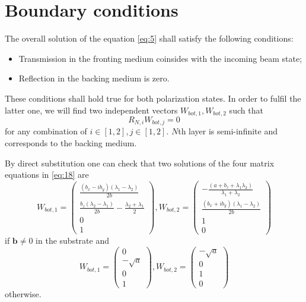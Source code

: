 \documentclass[12pt,a4paper]{article}
\begin{document}
\section{Boundary conditions}

The overall solution of the equation \ref{eq:5} shall satisfy the following conditions:

\begin{itemize}
\item Transmission in the fronting medium coinsides with the incoming beam state;
\item Reflection in the backing medium is zero.
\end{itemize}

These conditions shall hold true for both polarization states. In order to fulfil the latter one, we will find two independent vectors $W_{bot, 1}, W_{bot, 2}$ such that
\begin{equation} \label{eq:18}
R_{N, i} W_{bot, j} = 0
\end{equation}
for any combination of $i \in [1, 2], j \in [1, 2]$. $N$th layer is semi-infinite and corresponds to the backing medium.

By direct substitution one can check that two solutions of the four matrix equations in \ref{eq:18} are
\begin{equation} \label{eq:19}
W_{bot, 1}
=
\left(
\begin{matrix}
\frac{(b_x - i b_y) (\lambda_1 - \lambda_2)}{2 b} \\
\frac{b_z (\lambda_2 - \lambda_1)}{2 b} - \frac{\lambda_2 + \lambda_1}{2} \\
0 \\
1
\end{matrix}
\right),
W_{bot, 2}
=
\left(
\begin{matrix}
-\frac{(a + b_z + \lambda_1 \lambda_2)}{\lambda_1 + \lambda_2} \\
\frac{(b_x + i b_y) (\lambda_1 - \lambda_2)}{2 b} \\
1 \\
0
\end{matrix}
\right)
\end{equation}
if $\boldsymbol{b} \neq 0$ in the substrate and
\begin{equation} \label{eq:20}
W_{bot, 1}
=
\left(
\begin{matrix}
0 \\
-\sqrt{a} \\
0 \\
1
\end{matrix}
\right),
W_{bot, 2}
=
\left(
\begin{matrix}
-\sqrt{a} \\
0 \\
1 \\
0
\end{matrix}
\right)
\end{equation}
otherwise.
\end{document}
